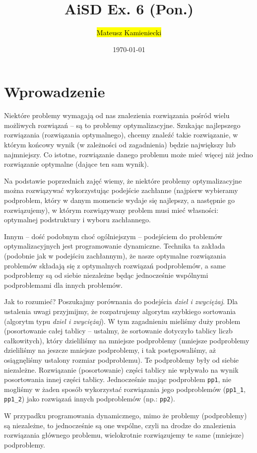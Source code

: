 \documentclass[twoside]{article}
\title{AiSD Ex. 6 (Pon.)}
\author{\hl{Mateusz Kamieniecki}}
\date{\today}
\begin{document}
\pagestyle{fancy}
\fancyhead{}
\fancyhead[L]{\@title}
\fancyhead[R]{\@author}
\fancyhead[C]{\@date}

\cfoot{\thepage\ / \pageref{LastPage}}


\newpage

\section{Wprowadzenie}
Niektóre problemy wymagają od nas znalezienia rozwiązania pośród wielu możliwych rozwiązań -- są
to problemy optymalizacyjne. Szukając najlepszego rozwiązania (rozwiązania optymalnego), chcemy
znaleźć takie rozwiązanie, w którym końcowy wynik (w zależności od zagadnienia) będzie największy
lub najmniejszy. Co istotne, rozwiązanie danego problemu może mieć więcej niż jedno rozwiązanie
optymalne (dające ten sam wynik).

Na podstawie poprzednich zajęć wiemy, że niektóre problemy optymalizacyjne można rozwiązywać
wykorzystując podejście zachłanne (najpierw wybieramy podproblem, który w danym momencie wydaje się najlepszy, a następnie go rozwiązujemy), w którym rozwiązywany problem musi mieć własności:
optymalnej podstruktury i wyboru zachłannego.

Innym -- dość podobnym choć ogólniejszym -- podejściem do problemów optymalizacyjnych jest 
programowanie dynamiczne.
Technika ta zakłada (podobnie jak w podejściu zachłannym), że nasze optymalne rozwiązania problemów
składają się z optymalnych rozwiązań podproblemów, a same podproblemy są od siebie niezależne będąc
jednocześnie wspólnymi podproblemami dla innych problemów.

Jak to rozumieć?
Poszukajmy porównania do podejścia \textit{dziel i zwyciężaj}.
Dla ustalenia uwagi przyjmijmy, że rozpatrujemy algorytm szybkiego sortowania (algorytm 
typu \textit{dziel i zwyciężaj}). 
W tym zagadnieniu mieliśmy duży problem (posortowanie całej tablicy -- ustalmy, że sortowanie 
dotyczyło tablicy liczb całkowitych), który dzieliliśmy na mniejsze podproblemy (mniejsze podproblemy dzieliliśmy na jeszcze mniejsze podproblemy, i tak postępowaliśmy, aż osiągnęliśmy
ustalony rozmiar podproblemu).
Te podproblemy były od siebie niezależne.
Rozwiązanie (posortowanie) części tablicy nie wpływało na wynik posortowania innej części tablicy.
Jednocześnie mając podproblem \verb|pp1|, nie mogliśmy w żaden sposób wykorzystać
rozwiązania jego podproblemów (\verb|pp1_1|, \verb|pp1_2|) jako rozwiązań innych podproblemów
(np.: \verb|pp2|).

W przypadku programowania dynamicznego, mimo że problemy (podproblemy) są niezależne, 
to jednocześnie są one wspólne, czyli na drodze do znalezienia rozwiązania głównego problemu,
wielokrotnie rozwiązujemy te same (mniejsze) podproblemy.
\end{document}
